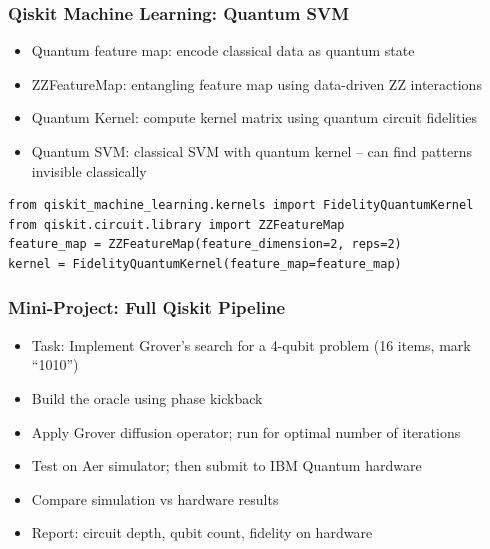 \begin{frame}[fragile]\frametitle{Qiskit Machine Learning: Quantum SVM}
\begin{itemize}
\item Quantum feature map: encode classical data as quantum state
\item ZZFeatureMap: entangling feature map using data-driven ZZ interactions
\item Quantum Kernel: compute kernel matrix using quantum circuit fidelities
\item Quantum SVM: classical SVM with quantum kernel -- can find patterns invisible classically
\end{itemize}
\begin{verbatim}
from qiskit_machine_learning.kernels import FidelityQuantumKernel
from qiskit.circuit.library import ZZFeatureMap
feature_map = ZZFeatureMap(feature_dimension=2, reps=2)
kernel = FidelityQuantumKernel(feature_map=feature_map)
\end{verbatim}
\end{frame}

\begin{frame}[fragile]\frametitle{Mini-Project: Full Qiskit Pipeline}
\begin{itemize}
\item Task: Implement Grover's search for a 4-qubit problem (16 items, mark ``1010'')
\item Build the oracle using phase kickback
\item Apply Grover diffusion operator; run for optimal number of iterations
\item Test on Aer simulator; then submit to IBM Quantum hardware
\item Compare simulation vs hardware results
\item Report: circuit depth, qubit count, fidelity on hardware
\end{itemize}
\end{frame}

